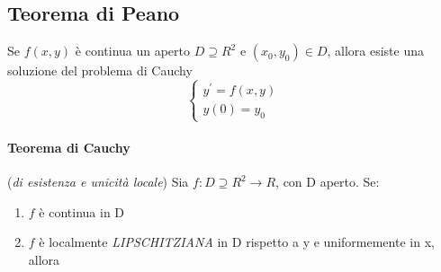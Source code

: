 \subsection{Teorema di Peano}
Se $f(x,y)$ è continua un aperto $D\supseteq R^2$ e $(x_0,y_0)\in D$, allora esiste una soluzione del problema di Cauchy
\begin{equation*}
	\begin{cases}
		y^\prime=f(x,y)\\
		y(0)=y_0
	\end{cases}
\end{equation*}
\paragraph{Teorema di Cauchy} (\textit{di esistenza e unicità locale}) Sia $f:D\supseteq R^2\to R$, con D aperto. Se:
\begin{enumerate}
	\item $f$ è continua in D
	\item $f$ è localmente \textit{LIPSCHITZIANA} in D rispetto a y e uniformemente in x, allora
\end{enumerate}



